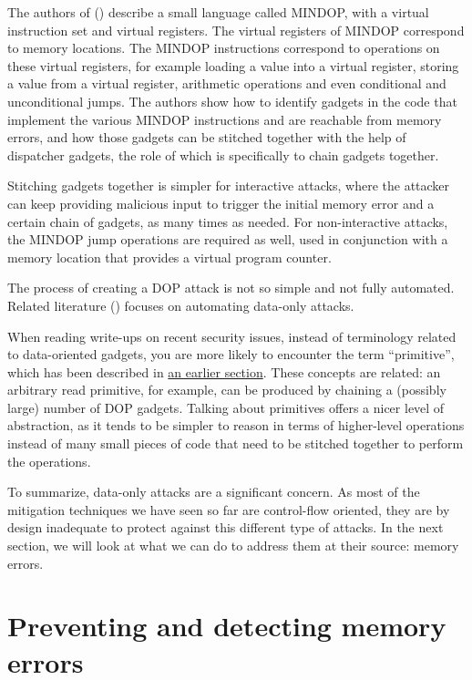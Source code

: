 \documentclass[
  a4paper,
]{report}
\begin{document}
The authors of () describe a small
language called MINDOP, with a virtual instruction set and virtual
registers. The virtual registers of MINDOP correspond to memory
locations. The MINDOP instructions correspond to operations on these
virtual registers, for example loading a value into a virtual register,
storing a value from a virtual register, arithmetic operations and even
conditional and unconditional jumps. The authors show how to identify
gadgets in the code that implement the various MINDOP instructions and
are reachable from memory errors, and how those gadgets can be stitched
together with the help of dispatcher gadgets, the role of which is
specifically to chain gadgets together.

Stitching gadgets together is simpler for interactive attacks, where the
attacker can keep providing malicious input to trigger the initial
memory error and a certain chain of gadgets, as many times as needed.
For non-interactive attacks, the MINDOP jump operations are required as
well, used in conjunction with a memory location that provides a virtual
program counter.

The process of creating a DOP attack is not so simple and not fully
automated. Related literature () focuses on automating data-only attacks.

When reading write-ups on recent security issues, instead of terminology
related to data-oriented gadgets, you are more likely to encounter the
term ``primitive'', which has been described in
\hyperref[exploitation-primitives]{an earlier section}. These concepts
are related: an arbitrary read primitive, for example, can be produced
by chaining a (possibly large) number of DOP gadgets. Talking about
primitives offers a nicer level of abstraction, as it tends to be
simpler to reason in terms of higher-level operations instead of many
small pieces of code that need to be stitched together to perform the
operations.

To summarize, data-only attacks are a significant concern. As most of
the mitigation techniques we have seen so far are control-flow oriented,
they are by design inadequate to protect against this different type of
attacks. In the next section, we will look at what we can do to address
them at their source: memory errors.

\section{Preventing and detecting memory
errors}\label{preventing-and-detecting-memory-errors}
\end{document}
